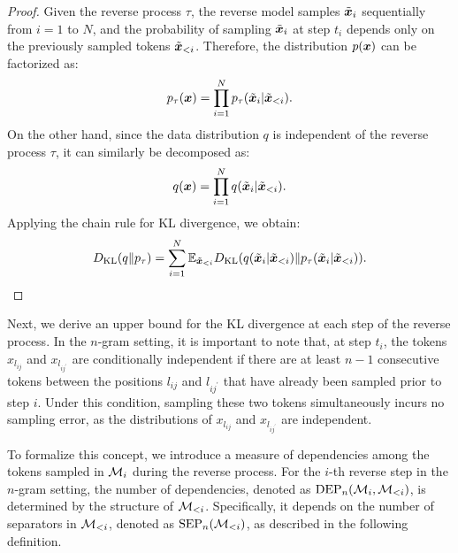 \begin{proof}
Given the reverse process $\tau$,  the reverse model samples $\Tilde{{\bm{x}}}_i$ sequentially from $i=1$ to $N$, and the probability of sampling $\Tilde{{\bm{x}}}_i$ at step $t_i$ depends only on the previously sampled tokens $\Tilde{{\bm{x}}}_{<i}$. Therefore, the distribution $p({\bm{x}})$ can be factorized as:
$$p_\tau({\bm{x}})=\prod_{i=1}^N p_\tau(\Tilde{{\bm{x}}}_i|\Tilde{{\bm{x}}}_{<i}).$$
On the other hand, since the data distribution $q$ is independent of the reverse process $\tau$, it can similarly be decomposed as:
$$q({\bm{x}})=\prod_{i=1}^N q(\Tilde{{\bm{x}}}_i|\Tilde{{\bm{x}}}_{<i}).$$
Applying the chain rule for KL divergence, we obtain:
$$D_{\mathrm{KL}}(q\|p_\tau) = \sum_{i=1}^N \mathbb{E}_{\Tilde{{\bm{x}}}_{<i}}D_{\mathrm{KL}}(q(\Tilde{{\bm{x}}}_i | \Tilde{{\bm{x}}}_{<i})\|p_\tau(\Tilde{{\bm{x}}}_i | \Tilde{{\bm{x}}}_{<i})).$$
\end{proof}

Next, we derive an upper bound for the KL divergence at each step of the reverse process. In the $n$-gram setting, it is important to note that, at step $t_i$, the tokens $x_{l_{ij}}$ and $x_{l_{ij^\prime}}$ are conditionally independent if there are at least $n-1$ consecutive tokens between the positions $l_{ij}$ and $l_{ij^\prime}$ that have already been sampled prior to step $i$. Under this condition, sampling these two tokens simultaneously incurs no sampling error, as the distributions of $x_{l_{ij}}$ and $x_{l_{ij^\prime}}$ are independent.

To formalize this concept, we introduce a measure of dependencies among the tokens sampled in ${\mathcal{M}}_i$ during the reverse process. For the $i$-th reverse step in the $n$-gram setting, the number of dependencies, denoted as $\operatorname{DEP}_n({\mathcal{M}}_i, {\mathcal{M}}_{<i})$, is determined by the structure of ${\mathcal{M}}_{<i}$. Specifically, it depends on the number of separators in ${\mathcal{M}}_{<i}$, denoted as $\operatorname{SEP}_n({\mathcal{M}}_{<i})$, as described in the following definition.


